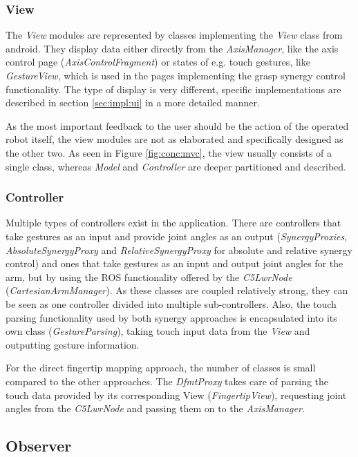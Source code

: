 \subsubsection{View}

The \textit{View} modules are represented by classes implementing the \textit{View} class from android. They display data either directly from the \textit{AxisManager}, like the axis control page (\textit{AxisControlFragment}) or states of e.g. touch gestures, like \textit{GestureView}, which is used in the pages implementing the grasp synergy control functionality. The type of display is very different, specific implementations are described in section \ref{sec:impl:ui} in a more detailed manner.

As the most important feedback to the user should be the action of the operated robot itself, the view modules are not as elaborated and specifically designed as the other two. As seen in Figure \ref{fig:conc:mvc}, the view usually consists of a single class, whereas \textit{Model} and \textit{Controller} are deeper partitioned and described.

\subsubsection{Controller}

Multiple types of controllers exist in the application. There are controllers that take gestures as an input and provide joint angles as an output (\textit{SynergyProxies}, \textit{AbsoluteSynergyProxy} and \textit{RelativeSynergyProxy} for absolute and relative synergy control) and ones that take gestures as an input and output joint angles for the arm, but by using the ROS functionality offered by the \textit{C5LwrNode} (\textit{CartesianArmManager}). As these classes are coupled relatively strong, they can be seen as one controller divided into multiple sub-controllers. Also, the touch parsing functionality used by both synergy approaches is encapsulated into its own class (\textit{GestureParsing}), taking touch input data from the \textit{View} and outputting gesture information.

For the direct fingertip mapping approach, the number of classes is small compared to the other approaches. The \textit{DfmtProxy} takes care of parsing the touch data provided by its corresponding View (\textit{FingertipView}), requesting joint angles from the \textit{C5LwrNode} and passing them on to the \textit{AxisManager}.

\subsection{Observer}

